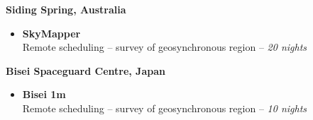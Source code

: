 \medskip

\normalsize \textbf{Siding Spring, Australia}

\medskip

\begin{itemize}
	\item \small \textbf{SkyMapper} \\
	Remote scheduling -- survey of geosynchronous region -- \textit{20 nights}
\end{itemize}

\medskip

\normalsize \textbf{Bisei Spaceguard Centre, Japan}

\medskip

\begin{itemize}
	\item \small \textbf{Bisei 1m} \\
	Remote scheduling -- survey of geosynchronous region -- \textit{10 nights}
\end{itemize}

